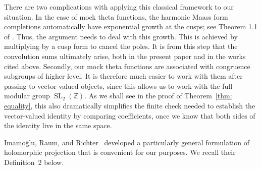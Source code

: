 \documentclass[11pt,reqno]{amsart}
\newcommand{\Z}{\mathbb{Z}}
\renewcommand{\=}{\;=\;}
\theoremstyle{myremark}
\begin{document}
There are two complications with applying this classical framework to our situation.
In the case of mock theta functions, the harmonic Maass form completions automatically have exponential growth at the cusps; see Theorem 1.1 of \cite{GOR}. 
Thus, the argument needs to deal with this growth. This is achieved by multiplying by a cusp form to cancel the poles. 
It is from this step that the convolution sums ultimately arise, both in the present paper and in the works cited above. 
Secondly, our mock theta functions are associated with congruence subgroups of higher level. 
It is therefore much easier to work with them after passing to vector-valued objects, since this allows us to work with the full modular group $\operatorname{SL}_2(\Z)$. 
As we shall see in the proof of Theorem~\ref{thm: equality}, this also dramatically simplifies the finite check needed to establish the vector-valued identity by comparing coefficients, once we know that both sides of the identity live in the same space.

Imamo\u{g}lu, Raum, and Richter~\cite{IRR} developed a particularly general formulation of holomorphic projection that is convenient for our purposes. 
We recall their Definition~2 below.
\end{document}
